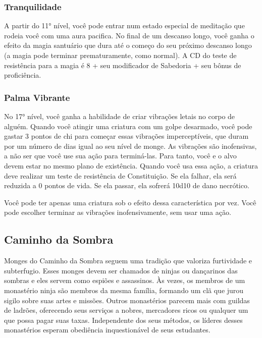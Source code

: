 \begin{multicols}{2}
\subsubsection*{Tranquilidade}%
\label{ssub:tranquilidade}

A partir do 11° nível, você pode entrar num estado especial de meditação que
rodeia você com uma aura pacifica. No final de um descanso longo, você ganha o
efeito da magia santuário que dura até o começo do seu próximo descanso longo (a
magia pode terminar prematuramente, como normal). A CD do teste de resistência
para a magia é 8 + seu modificador de Sabedoria + seu bônus de proficiência.

\subsubsection*{Palma Vibrante}%
\label{ssub:palma_vibrante}

No 17° nível, você ganha a habilidade de criar vibrações letais no corpo de
alguém. Quando você atingir uma criatura com um golpe desarmado, você pode
gastar 3 pontos de chi para começar essas vibrações imperceptíveis, que duram
por um número de dias igual ao seu nível de monge. As vibrações são inofensivas,
a não ser que você use sua ação para terminá-las. Para tanto, você e o alvo
devem estar no mesmo plano de existência. Quando você usa essa ação, a criatura
deve realizar um teste de resistência de Constituição. Se ela falhar, ela será
reduzida a 0 pontos de vida. Se ela passar, ela sofrerá 10d10 de dano
necrótico.

Você pode ter apenas uma criatura sob o efeito dessa característica por vez.
Você pode escolher terminar as vibrações inofensivamente, sem usar uma ação.

\subsection*{Caminho da Sombra}%
\label{sub:caminho_da_sombra}

Monges do Caminho da Sombra seguem uma tradição que valoriza furtividade e
subterfugio. Esses monges devem ser chamados de ninjas ou dançarinos das sombras
e eles servem como espiões e assassinos. Às vezes, os membros de um monastério
ninja são membros da mesma família, formando um clã que jurou sigilo sobre suas
artes e missões. Outros monastérios parecem mais com guildas de ladrões,
oferecendo seus serviços a nobres, mercadores ricos ou qualquer um que possa
pagar suas taxas. Independente dos seus métodos, os líderes desses monastérios
esperam obediência inquestionável de seus estudantes.


\end{multicols}

